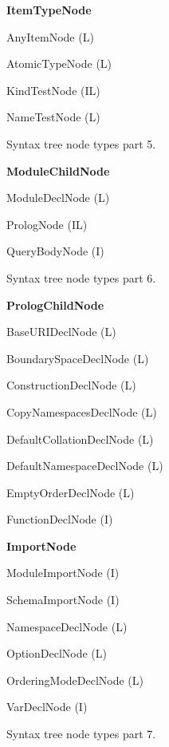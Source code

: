 \begin{figure}
\caption{Syntax tree node types part 5.}
\label{FIG_syntax_tree_node_types_part_5}
\begin{description}
\item \textbf{ItemTypeNode}
  \begin{description}
  \item AnyItemNode (L)
  \item AtomicTypeNode (L)
  \item KindTestNode (IL)
  \item NameTestNode (L)
  \end{description}
\end{description}
\end{figure}

\begin{figure}
\caption{Syntax tree node types part 6.}
\label{FIG_syntax_tree_node_types_part_6}
\begin{description}
\item \textbf{ModuleChildNode}
  \begin{description}
  \item ModuleDeclNode (L)
  \item PrologNode (IL)
  \item QueryBodyNode (I)
  \end{description}
\end{description}
\end{figure}

\begin{figure}
\caption{Syntax tree node types part 7.}
\label{FIG_syntax_tree_node_types_part_7}
\begin{description}
\item \textbf{PrologChildNode}
  \begin{description}
  \item BaseURIDeclNode (L)
  \item BoundarySpaceDeclNode (L)
  \item ConstructionDeclNode (L)
  \item CopyNamespacesDeclNode (L)
  \item DefaultCollationDeclNode (L)
  \item DefaultNamespaceDeclNode (L)
  \item EmptyOrderDeclNode (L)
  \item FunctionDeclNode (I)
  \item \textbf{ImportNode}
    \begin{description}
    \item ModuleImportNode (I)
    \item SchemaImportNode (I)
    \end{description}
  \item NamespaceDeclNode (L)
  \item OptionDeclNode (L)
  \item OrderingModeDeclNode (L)
  \item VarDeclNode (I)
  \end{description}
\end{description}
\end{figure}

